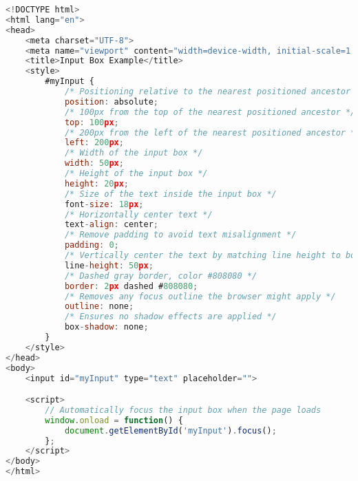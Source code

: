 \begin{lstlisting}[language=js,caption=input\_box.html]
<!DOCTYPE html>
<html lang="en">
<head>
	<meta charset="UTF-8">
	<meta name="viewport" content="width=device-width, initial-scale=1.0">
	<title>Input Box Example</title>
	<style>
		#myInput {
			/* Positioning relative to the nearest positioned ancestor */
			position: absolute;
			/* 100px from the top of the nearest positioned ancestor */
			top: 100px;
			/* 200px from the left of the nearest positioned ancestor */
			left: 200px;
			/* Width of the input box */
			width: 50px;
			/* Height of the input box */
			height: 20px;
			/* Size of the text inside the input box */
			font-size: 18px;
			/* Horizontally center text */
			text-align: center;
			/* Remove padding to avoid text misalignment */
			padding: 0;
			/* Vertically center the text by matching line height to box height */
			line-height: 50px;
			/* Dashed gray border, color #808080 */
			border: 2px dashed #808080;
			/* Removes any focus outline the browser might apply */
			outline: none;
			/* Ensures no shadow effects are applied */
			box-shadow: none;
		}
	</style>
</head>
<body>
	<input id="myInput" type="text" placeholder="">

	<script>
		// Automatically focus the input box when the page loads
		window.onload = function() {
			document.getElementById('myInput').focus();
		};
	</script>
</body>
</html>
\end{lstlisting}
